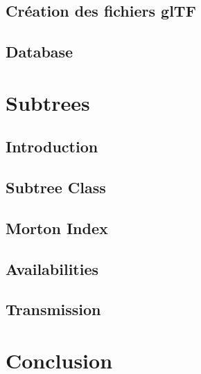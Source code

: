 \documentclass[
    TIC, %
    il, %
]{heig-tb}
\begin{document}
\section{Création des fichiers glTF}
\label{sec:gltf}


\section{Database}
\label{sec:database}


\chapter{Subtrees}

\section{Introduction}
\label{sec:subtrees-intro}


\section{Subtree Class}
\label{sec:subtree-class}


\section{Morton Index}
\label{sec:morton}


\section{Availabilities}
\label{sec:availability-class}


\section{Transmission}
\label{sec:transmission}


\chapter{Conclusion}
\label{sec:conclusion}


\clearpage
\printbibliography

\appendix
\appendixpage
\addappheadtotoc
\end{document}
